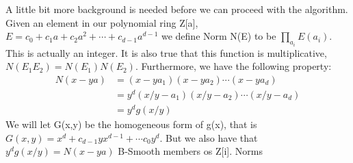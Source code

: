 \documentclass{article}
\begin{document}
A little bit more background is needed before we can proceed with the algorithm. Given an element in our polynomial ring Z[a], $E = c_0 + c_1 a + c_2 a^2 + \cdots + c_{d-1} a^{d-1}$ we define Norm N(E) to be $\prod_{a_i } E(a_i)$. This is actually an integer. It is also true that this function is multiplicative, $N(E_1 E_2) = N(E_1) N(E_2)$. Furthermore, we have the following property:
\begin{align}
    N(x - y a) &= (x - y a_1) (x - y a_2 ) \cdots (x - y a_d) \\
    &= y^d (x/y - a_1) (x/y - a_2 ) \cdots (x/y - a_d) \\
    &= y^d g(x/y)
\end{align}
We will let G(x,y) be the homogeneous form of g(x), that is $G(x,y) = x^d + c_{d-1} y x^{d-1} + \cdots c_0 y^d $. But we also have that  $y^d g(x/y) = N(x - y a) $
B-Smooth members os Z[i]. Norms
\end{document}
